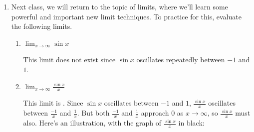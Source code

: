 \documentclass[main]{subfiles}
\begin{document}
\begin{enumerate}
\begin{enumerate}
    \end{enumerate}

\pspace{\newpage}

 

\item  %

Next class, we will return to the topic of limits, where we'll learn some powerful and important new limit techniques. To practice for this, evaluate the following limits. 
  
    \begin{enumerate}

    \item
      \begin{problem}[\vfill]
        $\displaystyle \lim_{x\to \infty} \sin x$
      \end{problem}

      \begin{solution}
        This limit does not exist since $\sin x$ oscillates repeatedly
        between $-1$ and $1$.
      \end{solution}

    \item
      \begin{problem}[\vfill]
        $\displaystyle \lim_{x\to \infty} \frac{\sin x}{x}$
      \end{problem}

      \begin{solution}
        This limit is .  Since $\sin x$ oscillates between $-1$
        and $1$, $\frac{\sin x}{x}$ oscillates between $\frac{-1}{x}$ and
        $\frac{1}{x}$.  But both $\frac{-1}{x}$ and $\frac{1}{x}$ approach
        0 as $x \to \infty$, so $\frac{\sin x}{x}$ must also.  Here's an
        illustration, with the graph of $\frac{\sin x}{x}$ in black:
        \begin{center}
        \end{center}
      \end{solution}



\end{enumerate}
\end{enumerate}
\end{document}
